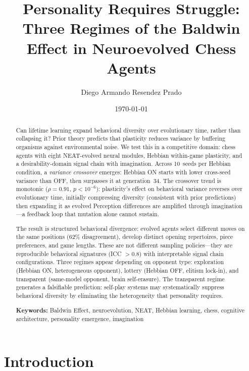 \documentclass[11pt,a4paper]{article}
\title{Personality Requires Struggle: Three Regimes of the Baldwin Effect in Neuroevolved Chess Agents}
\author[1]{Diego Armando Resendez Prado}
\affil[1]{Independent Researcher \\ \texttt{diego.resendez@zero-oneit.com}}
\date{\today}
\begin{document}
\maketitle

\begin{abstract}
Can lifetime learning expand behavioral diversity over evolutionary time, rather than collapsing it?
Prior theory predicts that plasticity reduces variance by buffering organisms against environmental noise.
We test this in a competitive domain: chess agents with eight NEAT-evolved neural modules, Hebbian within-game plasticity, and a desirability-domain signal chain with imagination.
Across 10~seeds per Hebbian condition, a \emph{variance crossover} emerges: Hebbian ON starts with lower cross-seed variance than OFF, then surpasses it at generation~34.
The crossover trend is monotonic ($\rho = 0.91$, $p < 10^{-6}$): plasticity's effect on behavioral variance reverses over evolutionary time, initially compressing diversity (consistent with prior predictions) then expanding it as evolved Perception differences are amplified through imagination---a feedback loop that mutation alone cannot sustain.

The result is structured behavioral divergence: evolved agents select different moves on the same positions (62\% disagreement), develop distinct opening repertoires, piece preferences, and game lengths.
These are not different sampling policies---they are reproducible behavioral signatures (ICC $> 0.8$) with interpretable signal chain configurations.
Three regimes appear depending on opponent type: exploration (Hebbian ON, heterogeneous opponent), lottery (Hebbian OFF, elitism lock-in), and transparent (same-model opponent, brain self-erasure).
The transparent regime generates a falsifiable prediction: self-play systems may systematically suppress behavioral diversity by eliminating the heterogeneity that personality requires.

\medskip
\noindent\textbf{Keywords:} Baldwin Effect, neuroevolution, NEAT, Hebbian learning, chess, cognitive architecture, personality emergence, imagination
\end{abstract}

\section{Introduction}
\end{document}
